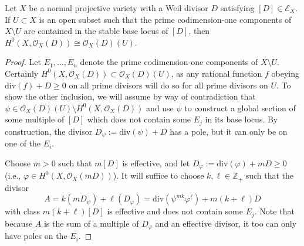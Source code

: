 \documentclass[10pt,a4paper]{amsart}
\begin{document}
\begin{lem}
    \label{lem:lift_to_global}
    Let $X$ be a normal projective variety with a Weil divisor $D$ satisfying $[D] \in \mathcal{E}_X$. If $U \subset X$ is an open subset such that the prime codimension-one components of $X \setminus U$ are contained in the stable base locus of $[D]$, then $H^0(X, \mathcal{O}_X(D)) \cong \mathcal{O}_X(D)(U)$.
\end{lem}

\begin{proof}
    Let $E_1, \dots, E_n$ denote the prime codimension-one components of $X \setminus U$. Certainly $H^0(X, \mathcal{O}_X(D)) \subset \mathcal{O}_X(D)(U)$, as any rational function $f$ obeying $\mathrm{div}(f) + D \geq 0$ on all prime divisors will do so for all prime divisors on $U$. To show the other inclusion, we will assume by way of contradiction that $\psi \in \mathcal{O}_X(D)(U) \setminus H^0(X, \mathcal{O}_X(D))$ and use $\psi$ to construct a global section of some multiple of $[D]$ which does not contain some $E_j$ in its base locus. By construction, the divisor $D_\psi := \mathrm{div}(\psi) + D$ has a pole, but it can only be on one of the $E_i$.

    Choose $m > 0$ such that $m[D]$ is effective, and let $D_\varphi := \mathrm{div}(\varphi) + mD \geq 0$ (i.e., $\varphi \in H^0(X, \mathcal{O}_X(mD))$). It will suffice to choose $k,\ell \in \mathbb{Z}_+$ such that the divisor 
    \begin{equation}
        A = k(mD_\psi) + \ell(D_\varphi) = \mathrm{div}(\psi^{mk}\varphi^{\ell}) + m(k+\ell)D
    \end{equation}
    with class $m(k+\ell)[D]$ is effective and does not contain some $E_j$. Note that because $A$ is the sum of a multiple of $D_\varphi$ and an effective divisor, it too can only have poles on the $E_i$. 
    

\end{proof}
\end{document}
